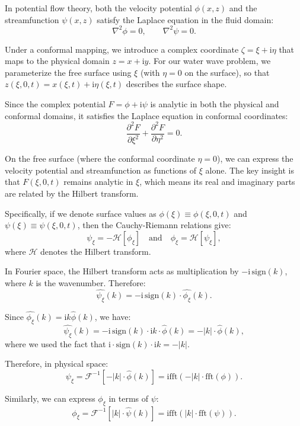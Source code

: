 \documentclass[12pt]{article}
\begin{document}
In potential flow theory, both the velocity potential $\phi(x,z)$ and the streamfunction $\psi(x,z)$ satisfy the Laplace equation in the fluid domain:
\[
\nabla^2 \phi = 0, \qquad \nabla^2 \psi = 0.
\]

Under a conformal mapping, we introduce a complex coordinate $\zeta = \xi + \mathrm{i}\eta$ that maps to the physical domain $z = x + \mathrm{i}y$. For our water wave problem, we parameterize the free surface using $\xi$ (with $\eta = 0$ on the surface), so that $z(\xi,0,t) = x(\xi,t) + \mathrm{i}\eta(\xi,t)$ describes the surface shape.

Since the complex potential $F = \phi + \mathrm{i}\psi$ is analytic in both the physical and conformal domains, it satisfies the Laplace equation in conformal coordinates:
\[
\frac{\partial^2 F}{\partial \xi^2} + \frac{\partial^2 F}{\partial \eta^2} = 0.
\]

On the free surface (where the conformal coordinate $\eta = 0$), we can express the velocity potential and streamfunction as functions of $\xi$ alone. The key insight is that $F(\xi,0,t)$ remains analytic in $\xi$, which means its real and imaginary parts are related by the Hilbert transform.

Specifically, if we denote surface values as $\phi(\xi) \equiv \phi(\xi,0,t)$ and $\psi(\xi) \equiv \psi(\xi,0,t)$, then the Cauchy-Riemann relations give:
\[
\psi_\xi = - \mathcal{H}[\phi_\xi] \quad \text{and} \quad \phi_\xi = \mathcal{H}[\psi_\xi],
\]
where \(\mathcal{H}\) denotes the Hilbert transform.

In Fourier space, the Hilbert transform acts as multiplication by $-\mathrm{i}\,\text{sign}(k)$, where $k$ is the wavenumber. Therefore:
\[
\widehat{\psi_\xi}(k) = -\mathrm{i}\,\text{sign}(k) \cdot \widehat{\phi_\xi}(k).
\]

Since $\widehat{\phi_\xi}(k) = \mathrm{i}k\widehat{\phi}(k)$, we have:
\[
\widehat{\psi_\xi}(k) = -\mathrm{i}\,\text{sign}(k) \cdot \mathrm{i}k \cdot \widehat{\phi}(k) = -|k| \cdot \widehat{\phi}(k),
\]
where we used the fact that $\mathrm{i} \cdot \text{sign}(k) \cdot \mathrm{i}k = -|k|$.

Therefore, in physical space:
\[
\psi_\xi = \mathcal{F}^{-1}[-|k| \cdot \widehat{\phi}(k)] = \text{ifft} \left( -|k| \cdot \text{fft}(\phi) \right).
\]

Similarly, we can express $\phi_\xi$ in terms of $\psi$:
\[
\phi_\xi = \mathcal{F}^{-1}[|k| \cdot \widehat{\psi}(k)] = \text{ifft} \left( |k| \cdot \text{fft}(\psi) \right).
\]
\end{document}
